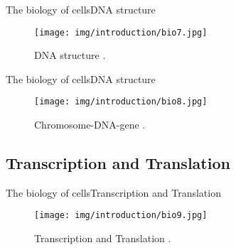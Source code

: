 \documentclass[10pt]{beamer}
\newcommand{\1}{
	\setbeamertemplate{background}{
		\texttt{[image: img/1]}
		\tikz[overlay] \fill[fill opacity=0.75,fill=white] (0,0) rectangle (-\paperwidth,\paperheight);
	}
}
\begin{document}
\begin{frame}{The biology of cells}{DNA structure}
\begin{figure}[]
 \centering
    \texttt{[image: img/introduction/bio7.jpg]}
    \label{img:mot2}
    \caption{DNA structure \cite{dnastructure2020}.}
\end{figure}
\end{frame}

\begin{frame}{The biology of cells}{DNA structure}
\begin{figure}[]
 \centering
    \texttt{[image: img/introduction/bio8.jpg]}
    \label{img:mot2}
    \caption{Chromosome-DNA-gene \cite{dnacromosome2020}.}
\end{figure}
\end{frame} 

\subsection{Transcription and Translation}

\begin{frame}{The biology of cells}{Transcription and Translation}
\begin{figure}[]
 \centering
    \texttt{[image: img/introduction/bio9.jpg]}
    \label{img:mot2}
    \caption{Transcription and Translation \cite{dnacromosome2020}.}
\end{figure}
\end{frame}
\end{document}
